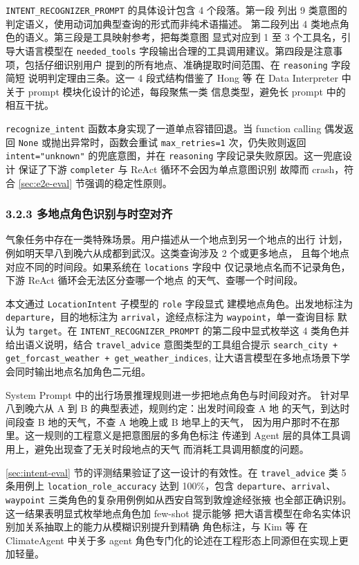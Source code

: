 \texttt{INTENT\_\bk{}RECOGNIZER\_\bk{}PROMPT} 的具体设计包含 4 个段落。第一段
列出 9 类意图的判定语义，使用动词加典型查询的形式而非纯术语描述。
第二段列出 4 类地点角色的语义。第三段是工具映射参考，把每类意图
显式对应到 1 至 3 个工具名，引导大语言模型在 \texttt{needed\_\bk{}tools}
字段输出合理的工具调用建议。第四段是注意事项，包括仔细识别用户
提到的所有地点、准确提取时间范围、在 \texttt{reasoning} 字段简短
说明判定理由三条。这一 4 段式结构借鉴了 Hong 等 \cite{ref20} 在
Data Interpreter 中关于 prompt 模块化设计的论述，每段聚焦一类
信息类型，避免长 prompt 中的相互干扰。

\texttt{recognize\_\bk{}intent} 函数本身实现了一道单点容错回退。当
function calling 偶发返回 \texttt{None} 或抛出异常时，函数会重试
\texttt{max\_\bk{}retries=\bk{}1} 次，仍失败则返回 \texttt{intent=\bk{}"unknown"}
的兜底意图，并在 \texttt{reasoning} 字段记录失败原因。这一兜底设计
保证了下游 \texttt{completer} 与 ReAct 循环不会因为单点意图识别
故障而 crash，符合 \ref{sec:e2e-eval} 节强调的稳定性原则。

\subsubsection*{3.2.3 \quad 多地点角色识别与时空对齐}

气象任务中存在一类特殊场景。用户描述从一个地点到另一个地点的出行
计划，例如明天早八到晚六从成都到武汉。这类查询涉及 2 个或更多地点，
且每个地点对应不同的时间段。如果系统在 \texttt{locations} 字段中
仅记录地点名而不记录角色，下游 ReAct 循环会无法区分查哪一个地点
的天气、查哪一个时间段。

本文通过 \texttt{LocationIntent} 子模型的 \texttt{role} 字段显式
建模地点角色。出发地标注为 \texttt{departure}，目的地标注为
\texttt{arrival}，途经点标注为 \texttt{waypoint}，单一查询目标
默认为 \texttt{target}。在 \texttt{INTENT\_\bk{}RECOGNIZER\_\bk{}PROMPT}
的第二段中显式枚举这 4 类角色并给出语义说明，结合
\texttt{travel\_\bk{}advice} 意图类型的工具组合提示
\texttt{search\_\bk{}city + get\_\bk{}forcast\_\bk{}weather + get\_\bk{}weather\_\bk{}indices},
让大语言模型在多地点场景下学会同时输出地点名加角色二元组。

System Prompt 中的出行场景推理规则进一步把地点角色与时间段对齐。
针对早八到晚六从 A 到 B 的典型表述，规则约定：出发时间段查 A 地
的天气，到达时间段查 B 地的天气，不查 A 地晚上或 B 地早上的天气，
因为用户那时不在那里。这一规则的工程意义是把意图层的多角色标注
传递到 Agent 层的具体工具调用上，避免出现查了无关时段地点的天气
而消耗工具调用额度的问题。

\ref{sec:intent-eval} 节的评测结果验证了这一设计的有效性。在
\texttt{travel\_\bk{}advice} 类 5 条用例上 \texttt{location\_\bk{}role\_\bk{}accuracy}
达到 100\%，包含 \texttt{departure}、\texttt{arrival}、
\texttt{waypoint} 三类角色的复杂用例例如从西安自驾到敦煌途经张掖
也全部正确识别。这一结果表明显式枚举地点角色加 few-shot 提示能够
把大语言模型在命名实体识别加关系抽取上的能力从模糊识别提升到精确
角色标注，与 Kim 等 \cite{ref1} 在 ClimateAgent 中关于多 agent
角色专门化的论述在工程形态上同源但在实现上更加轻量。

